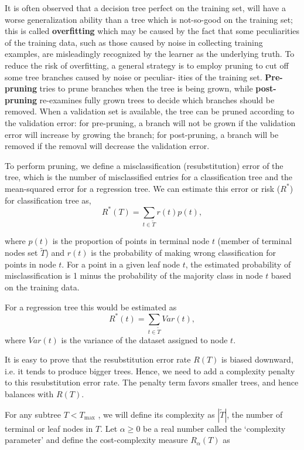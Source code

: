 It is often observed that a decision tree perfect on the training set,
will have a worse generalization ability than a tree which is
not-so-good on the training set; this is called \textbf{overfitting}
which may be caused by the fact that some peculiarities of the
training data, such as those caused by noise in collecting training
examples, are misleadingly recognized by the learner as the underlying
truth. To reduce the risk of overfitting, a general strategy is to
employ pruning to cut off some tree branches caused by noise or
peculiar- ities of the training set. \textbf{Pre-pruning} tries to
prune branches when the tree is being grown, while
\textbf{post-pruning} re-examines fully grown trees to decide which
branches should be removed. When a validation set is available, the
tree can be pruned according to the validation error: for pre-pruning,
a branch will not be grown if the validation error will increase by
growing the branch; for post-pruning, a branch will be removed if the
removal will decrease the validation error.

To perform pruning, we define a misclassification (resubstitution) error of the
tree, which is the number of misclassified entries for a classification tree and
the mean-squared error for a regression tree. We can estimate this
error or risk ($R^*$)
for classification tree as,
\begin{equation}
    \label{eq:def_risk}
    R^*(T) = \sum_{t \in \tilde{T}} r(t) p(t),
\end{equation}

where $p(t)$ is the proportion of points in terminal node $t$ (member of
terminal nodes set $\tilde{T}$) and $r(t)$ is the probability of making wrong
classification for points in node $t$. For a point in a given leaf node $t$, the
estimated probability of misclassification is 1 minus the probability of the
majority class in node $t$ based on the training data.

For a regression tree this would be estimated as
$$
    R^*(t) = \sum_{t \in \tilde{T}} Var(t),
$$
where $Var(t)$ is the variance of the dataset assigned to node $t$.

It is easy to prove that the resubstitution error rate $R(T)$ is biased downward,
i.e. it tends to produce bigger trees. Hence, we need to add a complexity penalty
to this resubstitution error rate. The penalty term favors smaller trees, and
hence balances with $R(T)$.

For any subtree $T < T_{\text{max}}$ , we will define its complexity as
$|\tilde{T}|$, the number of terminal or leaf nodes in $T$. Let $\alpha \ge 0$
be a real number called the `complexity parameter' and define the cost-complexity
measure $R_{\alpha}(T)$ as


